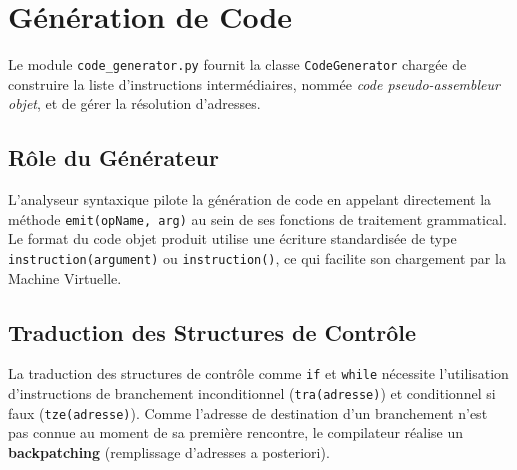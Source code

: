 \documentclass[a4paper, 12pt]{article}
\begin{document}
\newpage

\section{Génération de Code}

Le module \texttt{code\_generator.py} fournit la classe \texttt{CodeGenerator} chargée de construire la liste d'instructions intermédiaires, nommée \emph{code pseudo-assembleur objet}, et de gérer la résolution d'adresses.

\subsection{Rôle du Générateur}
L'analyseur syntaxique pilote la génération de code en appelant directement la méthode \texttt{emit(opName, arg)} au sein de ses fonctions de traitement grammatical.
Le format du code objet produit utilise une écriture standardisée de type \texttt{instruction(argument)} ou \texttt{instruction()}, ce qui facilite son chargement par la Machine Virtuelle.

\subsection{Traduction des Structures de Contrôle}
La traduction des structures de contrôle comme \texttt{if} et \texttt{while} nécessite l'utilisation d'instructions de branchement inconditionnel (\texttt{tra(adresse)}) et conditionnel si faux (\texttt{tze(adresse)}). Comme l'adresse de destination d'un branchement n'est pas connue au moment de sa première rencontre, le compilateur réalise un \textbf{backpatching} (remplissage d'adresses a posteriori).
\end{document}
